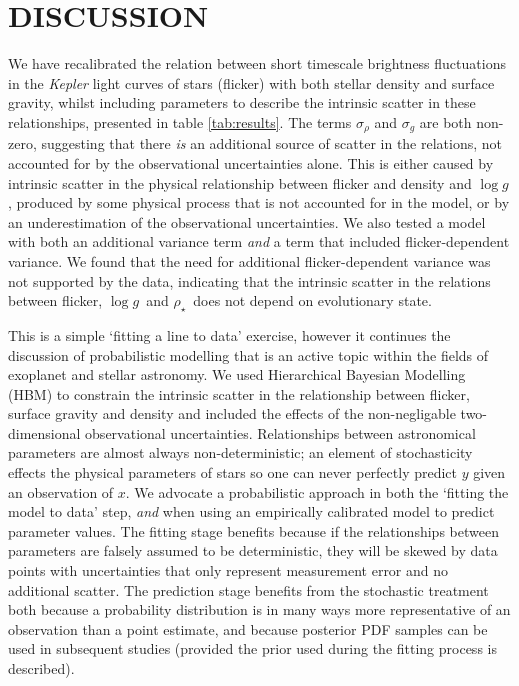 \documentclass[apjl]{emulateapj}
\newcommand{\logg}{$\log g$}
\newcommand{\rhostar}{$\rho_{\star}$}
\begin{document}
\section{DISCUSSION}
\label{sec:discussion}


We have recalibrated the relation between short timescale brightness
fluctuations in the {\it Kepler} light curves of stars (flicker) with both
stellar density and surface gravity, whilst including parameters to describe
the intrinsic scatter in these relationships, presented in table
\ref{tab:results}.
The terms $\sigma_\rho$ and $ \sigma_g$ are both non-zero, suggesting that
there {\it is} an additional source of scatter in the relations, not accounted
for by the observational uncertainties alone.
This is either caused by intrinsic scatter in the physical relationship
between flicker and density and \logg, produced by some physical process that
is not accounted for in the model, or by an underestimation of the
observational uncertainties.
We also tested a model with both an additional variance term {\it and} a term
that included flicker-dependent variance.
We found that the need for additional flicker-dependent variance was not
supported by the data, indicating that the intrinsic scatter in the relations
between flicker, \logg\ and \rhostar\ does not depend on evolutionary state.

This is a simple `fitting a line to data' exercise, however it continues the
discussion of probabilistic modelling that is an active topic within the
fields of exoplanet and stellar astronomy.
We used Hierarchical Bayesian Modelling (HBM) to constrain the intrinsic
scatter in the relationship between flicker, surface gravity and density and
included the effects of the non-negligable two-dimensional observational
uncertainties.
Relationships between astronomical parameters are almost always
non-deterministic; an element of stochasticity effects the physical parameters
of stars so one can never perfectly predict $y$ given an observation of $x$.
We advocate a probabilistic approach in both the `fitting the model to data'
step, {\it and} when using an empirically calibrated model to predict
parameter values.
The fitting stage benefits because if the relationships between parameters are
falsely assumed to be deterministic, they will be skewed by data points with
uncertainties that only represent measurement error and no additional scatter.
The prediction stage benefits from the stochastic treatment both because a
probability distribution is in many ways more representative of an observation
than a point estimate, and because posterior PDF samples can be used in
subsequent studies (provided the prior used during the fitting process is
described).
\end{document}
